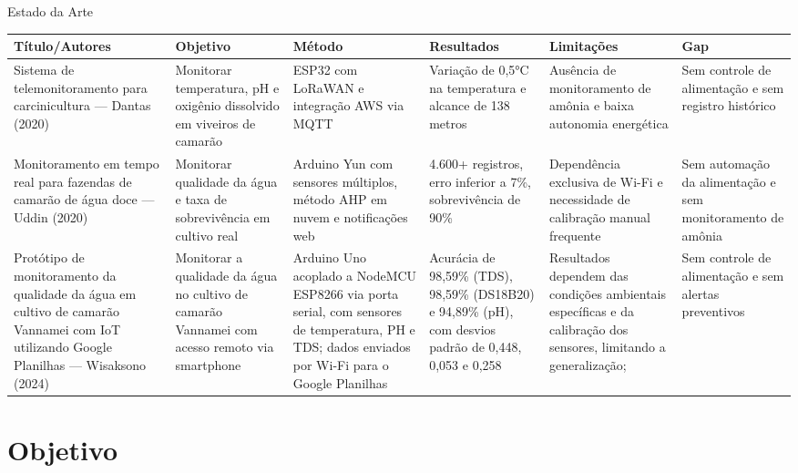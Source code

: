 \documentclass[aspectratio=169]{beamer}
\begin{document}
{
\usebackgroundtemplate{}
\begin{frame}[t]{Estado da Arte}

\begin{table}
    \centering
    \tiny
    \begin{tabular}{|L{2.5cm}|L{2cm}|L{2cm}|L{2cm}|L{2cm}|L{1.5cm}|}
      \hline
      \textbf{Título/Autores} & \textbf{Objetivo} & \textbf{Método} & \textbf{Resultados} & \textbf{Limitações} & \textbf{Gap} \\
      \hline
      Sistema de telemonitoramento para carcinicultura — Dantas (2020) & Monitorar temperatura, pH e oxigênio dissolvido em viveiros de camarão & ESP32 com LoRaWAN e integração AWS via MQTT & Variação de 0,5°C na temperatura e alcance de 138 metros & Ausência de monitoramento de amônia e baixa autonomia energética & Sem controle de alimentação e sem registro histórico \\
      \hline
      Monitoramento em tempo real para fazendas de camarão de água doce — Uddin (2020) & Monitorar qualidade da água e taxa de sobrevivência em cultivo real & Arduino Yun com sensores múltiplos, método AHP em nuvem e notificações web & 4.600+ registros, erro inferior a 7\%, sobrevivência de 90\% & Dependência exclusiva de Wi-Fi e necessidade de calibração manual frequente & Sem automação da alimentação e sem monitoramento de amônia \\
      \hline
      Protótipo de monitoramento da qualidade da água em cultivo de camarão Vannamei com IoT utilizando Google Planilhas — Wisaksono (2024) & Monitorar a qualidade da água no cultivo de camarão Vannamei com acesso remoto via smartphone & Arduino Uno acoplado a NodeMCU ESP8266 via porta serial, com sensores de temperatura, PH e TDS; dados enviados por Wi-Fi para o Google Planilhas & Acurácia de 98,59\% (TDS), 98,59\% (DS18B20) e 94,89\% (pH), com desvios padrão de 0,448, 0,053 e 0,258 & Resultados dependem das condições ambientais específicas e da calibração dos sensores, limitando a generalização; & Sem controle de alimentação e sem alertas preventivos \\
      \hline
    \end{tabular}
  \end{table}
\end{frame}
}

\section{Objetivo}
\end{document}
